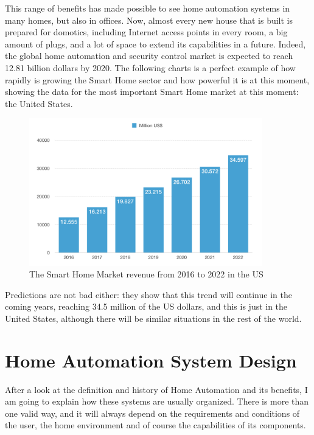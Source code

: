 This range of benefits has made possible to see home automation systems in many homes, but also in offices. Now, almost 
every new house that is built is prepared for domotics, including Internet access points in every room, a big amount of plugs, 
and a lot of space to extend its capabilities in a future. Indeed, the global home automation and security control market is 
expected to reach 12.81 billion dollars by 2020.\cite{reutersResearchMarkets} The following charts is a perfect example of how 
rapidly is growing the Smart Home sector and how powerful it is at this moment, showing the data for the most important Smart
Home market at this moment: the United States.

\begin{figure}
	\centering
	\includegraphics[width=0.9\textwidth]{images/Chapter_02/sh-market-revenue.png}
	\caption{The Smart Home Market revenue from 2016 to 2022 in the US\cite{statistaSmartHomeUS}}
	\label{fig:sh-market-revenue}
\end{figure}

Predictions are not bad either: they show that this trend will continue in the coming years, reaching 34.5 million of the 
US dollars, and this is just in the United States, although there will be similar situations in the rest of the world.

\bigskip
\section{Home Automation System Design}
After a look at the definition and history of Home Automation and its benefits, I am going to explain how these systems are 
usually organized. There is more than one valid way, and it will always depend on the requirements and conditions of the user,
the home environment and of course the capabilities of its components. 

